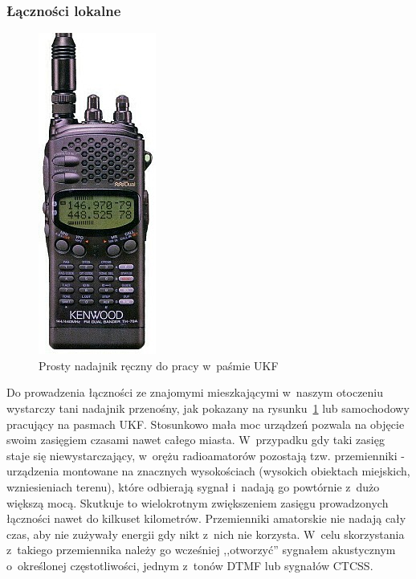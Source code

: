 \documentclass[]{mgr}
\begin{document}
                \subsubsection{Łączności lokalne}
                    \begin{figure}
                        \vspace{-20pt}
                        \begin{center}
                            \includegraphics[scale=0.5]{ukf_handheld}
                        \end{center}
                        \vspace{-20pt}
                        \caption{Prosty nadajnik ręczny do pracy w~paśmie UKF}
                        \vspace{-20pt}
                        \label{fig:ukf_handheld}
                    \end{figure}
                Do prowadzenia łączności ze znajomymi mieszkającymi w~naszym otoczeniu wystarczy tani nadajnik przenośny, jak pokazany na rysunku~\ref{fig:ukf_handheld} lub samochodowy pracujący na pasmach UKF. Stosunkowo mała moc urządzeń pozwala na objęcie swoim zasięgiem czasami nawet całego miasta. W~przypadku gdy taki zasięg staje się niewystarczający, w~orężu radioamatorów pozostają tzw. przemienniki - urządzenia montowane na znacznych wysokościach (wysokich obiektach miejskich, wzniesieniach terenu), które odbierają sygnał i~nadają go powtórnie z~dużo większą mocą. Skutkuje to wielokrotnym zwiększeniem zasięgu prowadzonych łączności nawet do kilkuset kilometrów. Przemienniki amatorskie nie nadają cały czas, aby nie zużywały energii gdy nikt z~nich nie korzysta. W~celu skorzystania z~takiego przemiennika należy go wcześniej ,,otworzyć'' sygnałem akustycznym o~określonej częstotliwości, jednym z~tonów DTMF lub sygnałów CTCSS.
\end{document}

